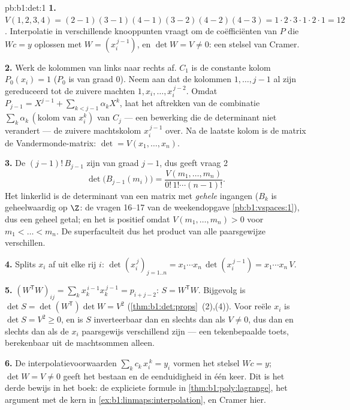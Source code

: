 \begin{solution}{pb:b1:det:1}
\textbf{1.} $V(1,2,3,4) = (2-1)(3-1)(4-1)(3-2)(4-2)(4-3) = 1
\cdot 2\cdot 3\cdot 1\cdot 2\cdot 1 = 12$. Interpolatie in
verschillende knooppunten vraagt om de coëfficiënten van $P$ die
$W c = y$ oplossen met $W = (x_i^{\,j-1})$, en $\det W = V \neq 0$:
een stelsel van Cramer.

\textbf{2.} Werk de kolommen van links naar rechts af. $C_1$ is de
constante kolom $P_0(x_i) = 1$ ($P_0$ is  van graad $0$).
Neem aan dat de kolommen $1, \dots, j-1$ al zijn gereduceerd tot de
zuivere machten $1, x_i, \dots, x_i^{\,j-2}$. Omdat $P_{j-1} =
X^{j-1} + \sum_{k < j-1}\alpha_k X^k$, laat het aftrekken van de
combinatie $\sum_k \alpha_k\,(\text{kolom van } x_i^k)$ van $C_j$
--- een bewerking die de determinant niet verandert --- de zuivere
machtskolom $x_i^{\,j-1}$ over. Na de laatste kolom is de matrix de
Vandermonde-matrix: $\det = V(x_1, \dots, x_n)$.

\textbf{3.} De  $(j-1)!\,B_{j-1}$ zijn  van graad
$j - 1$, dus geeft vraag 2
\[
\det\bigl(B_{j-1}(m_i)\bigr)
= \frac{V(m_1, \dots, m_n)}{0!\,1!\cdots(n-1)!} .
\]
Het linkerlid is de determinant van een matrix met \emph{gehele}
ingangen ($B_k$ is geheelwaardig op $\Z$: de vragen 16--17 van de
weekendopgave \cref{pb:b1:vspaces:1}), dus een geheel getal; en het
is positief omdat $V(m_1, \dots, m_n) > 0$ voor $m_1 < \dots <
m_n$. De superfaculteit  dus het product van alle paarsgewijze
verschillen.

\textbf{4.} Splits $x_i$ af uit elke rij $i$:
$\det(x_i^{\,j})_{j = 1..n} = x_1\cdots x_n\,
\det(x_i^{\,j-1}) = x_1\cdots x_n\,V$.

\textbf{5.} $(W^{\mathsf T}W)_{ij} = \sum_k x_k^{\,i-1}
x_k^{\,j-1} = p_{i+j-2}$: $S = W^{\mathsf T}W$. Bijgevolg is $\det
S = \det(W^{\mathsf T})\det W = V^2$
(\cref{thm:b1:det:props}~(2),(4)). Voor reële $x_i$ is $\det S =
V^2 \geq 0$, en is $S$ inverteerbaar dan en slechts dan als $V \neq
0$, dus dan en slechts dan als de $x_i$ paarsgewijs verschillend
zijn --- een tekenbepaalde toets, berekenbaar uit de machtsommen
alleen.

\textbf{6.} De interpolatievoorwaarden $\sum_{k} c_k\,x_i^{\,k} =
y_i$ vormen het stelsel $Wc = y$; $\det W = V \neq 0$ geeft het
bestaan en de eenduidigheid in één keer. Dit is het derde bewijs in
het boek: de expliciete formule in \cref{thm:b1:poly:lagrange}, het
argument met de kern in \cref{ex:b1:linmaps:interpolation}, en
Cramer hier.


\end{solution}

